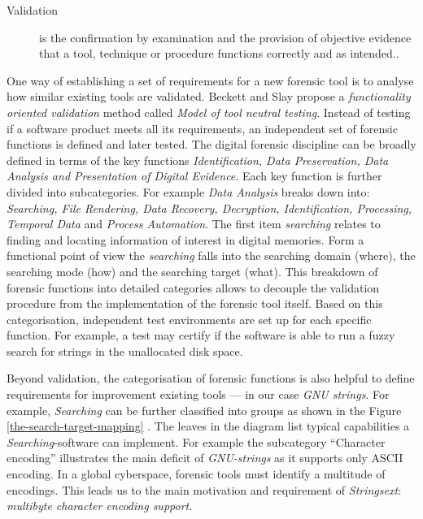 \documentclass[final,5p,times,twocolumn]{elsarticle}
\begin{document}
\begin{description}
\item[Validation]
    is the confirmation by examination and the provision of objective
    evidence that a tool, technique or procedure functions correctly and as
    intended.\cite[p. 92]{craiger2006}.
\end{description}


One way of establishing a set of requirements for a new forensic tool is to
analyse how similar existing tools are validated. Beckett and Slay
\cite{beckett2007} propose a \emph{functionality oriented validation} method
called \emph{Model of tool neutral testing}. Instead of testing if a software
product meets all its requirements, an independent set of forensic functions is
defined and later tested. The digital forensic discipline can be broadly defined
in terms of the key functions \emph{Identification, Data Preservation, Data
Analysis and Presentation of Digital Evidence}. Each key function is further
divided into subcategories. For example \emph{Data Analysis} breaks down into:
\emph{Searching, File Rendering, Data Recovery, Decryption, Identification,
Processing, Temporal Data} and \emph{Process Automation}.  The first item
\emph{searching} relates to finding and locating information of interest in
digital memories. Form a functional point of view the \emph{searching} falls
into the searching domain (where), the searching mode (how) and the searching
target (what). This breakdown of forensic functions into detailed categories
allows to decouple the validation procedure from the implementation of the
forensic tool itself. Based on this categorisation, independent test
environments are set up for each specific function. For example, a
test may certify if the software is able to run a fuzzy search for strings in
the unallocated disk space.

Beyond validation, the categorisation of forensic functions is also helpful to
define requirements for improvement existing tools — in our case \emph{GNU
strings}. For example, \emph{Searching} can be further classified into groups as
shown in the Figure \ref{the-search-target-mapping} \cite[p. 17]{beckett2007}.
The leaves in the diagram list typical capabilities a \emph{Searching}-software
can implement.  For example the subcategory ``Character encoding'' illustrates
the main deficit of \emph{GNU-strings} as it supports only ASCII encoding. In a
global cyberspace, forensic tools must identify a multitude of encodings. This
leads us to the main motivation and requirement of \emph{Strings­ext}:
\emph{multibyte character encoding support}.
\end{document}
